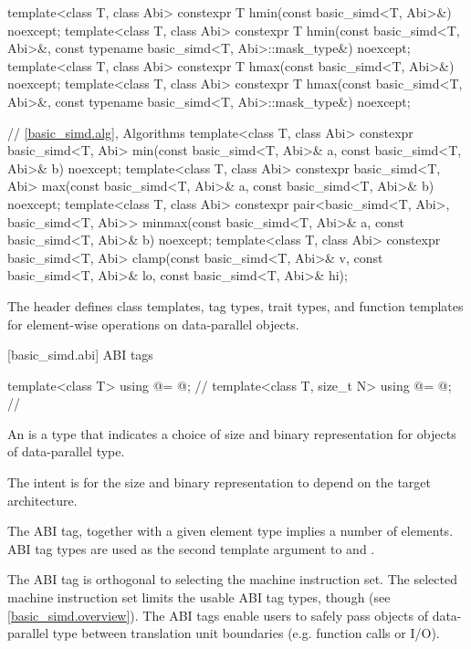 \begin{codeblock}
{  template<class T, class Abi>
    constexpr T hmin(const basic_simd<T, Abi>&) noexcept;
  template<class T, class Abi>
    constexpr T hmin(const basic_simd<T, Abi>&, const typename basic_simd<T, Abi>::mask_type&) noexcept;
  template<class T, class Abi>
    constexpr T hmax(const basic_simd<T, Abi>&) noexcept;
  template<class T, class Abi>
    constexpr T hmax(const basic_simd<T, Abi>&, const typename basic_simd<T, Abi>::mask_type&) noexcept;

  // \ref{basic_simd.alg}, Algorithms
  template<class T, class Abi>
    constexpr basic_simd<T, Abi>
      min(const basic_simd<T, Abi>& a, const basic_simd<T, Abi>& b) noexcept;
  template<class T, class Abi>
    constexpr basic_simd<T, Abi>
      max(const basic_simd<T, Abi>& a, const basic_simd<T, Abi>& b) noexcept;
  template<class T, class Abi>
    constexpr pair<basic_simd<T, Abi>, basic_simd<T, Abi>>
      minmax(const basic_simd<T, Abi>& a, const basic_simd<T, Abi>& b) noexcept;
  template<class T, class Abi>
    constexpr basic_simd<T, Abi>
      clamp(const basic_simd<T, Abi>& v,
            const basic_simd<T, Abi>& lo,
            const basic_simd<T, Abi>& hi);
}
\end{codeblock}

\pnum
The header  defines class templates, tag types, trait types, and function templates for element-wise operations on data-parallel objects.

[basic_simd.abi]{ ABI tags}

\begin{codeblock}
template<class T> using @\nativeabi@ = @\seebelow@; // \expos
template<class T, size_t N> using @\deducet@ = @\seebelow@; // \expos
\end{codeblock}

\pnum
An  is a type that indicates a choice of size and binary
representation for objects of data-parallel type.
\begin{note}
  The intent is for the size and binary representation to depend on the target
  architecture.
\end{note}
The ABI tag, together with a given element type implies a number of elements.
ABI tag types are used as the second template argument to 
and .

\pnum
\begin{note}
The ABI tag is orthogonal to selecting the machine instruction set.
The selected machine instruction set limits the usable ABI tag types, though
(see \ref{basic_simd.overview}).
The ABI tags enable users to safely pass objects of data-parallel type between
translation unit boundaries (e.g. function calls or I/O).
\end{note}

